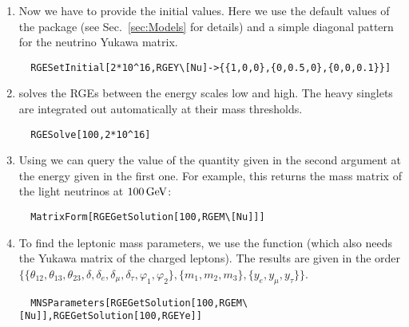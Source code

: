 \begin{enumerate}
\item Now we have to provide the initial values.  Here we use the
default values of the package (see Sec.~\ref{sec:Models} for details) and a
simple diagonal pattern for the neutrino Yukawa matrix.
%
\begin{verbatim}
  RGESetInitial[2*10^16,RGEY\[Nu]->{{1,0,0},{0,0.5,0},{0,0,0.1}}]
\end{verbatim}

\item {} solves the RGEs
between the energy scales low and high.  The heavy singlets are
integrated out automatically at their mass thresholds.
%
\begin{verbatim}
  RGESolve[100,2*10^16]
\end{verbatim}

\item Using 
we can query the value of the quantity given in the second argument at
the energy given in the first one.  For example, this returns the mass
matrix of the light neutrinos at $100\,\mathrm{GeV}$:
\begin{verbatim}
  MatrixForm[RGEGetSolution[100,RGEM\[Nu]]]
\end{verbatim}

\item To find the leptonic mass parameters, we use the function
 (which also
needs the Yukawa matrix of the charged leptons).  The results are given
in the order
$\{\{\theta_{12},\theta_{13},\theta_{23},\delta,\delta_e,\delta_\mu,
\delta_\tau,\varphi_1,\varphi_2\},
\{m_1,m_2,m_3\},\{y_e,y_\mu,y_\tau\}\}$.
\begin{verbatim}
  MNSParameters[RGEGetSolution[100,RGEM\[Nu]],RGEGetSolution[100,RGEYe]]
\end{verbatim}


\end{enumerate}

